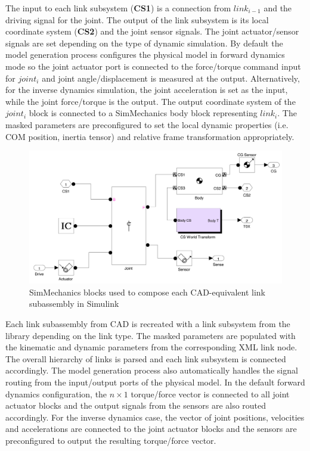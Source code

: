 The input to each link subsystem (\textbf{CS1}) is a connection from $link_{i-1}$ and the driving signal for the joint. The output of the link subsystem is its local coordinate system (\textbf{CS2}) and the joint sensor signals. The joint actuator/sensor signals are set depending on the type of dynamic simulation. By default the model generation process configures the physical model in forward dynamics mode so the joint actuator port is connected to the force/torque command input for $joint_{i}$ and joint angle/displacement is measured at the output. Alternatively, for the inverse dynamics simulation, the joint acceleration is set as the input, while the joint force/torque is the output. The output coordinate system of the $joint_{i}$ block is connected to a SimMechanics body block representing $link_{i}$. The masked parameters are preconfigured to set the local dynamic properties (i.e. COM position, inertia tensor) and relative frame transformation appropriately.

\begin{figure}[!h]
	\centering
    \includegraphics[scale=0.6]{fig/toolchain/undermask.pdf}
  	\caption{SimMechanics blocks used to compose each CAD-equivalent link subassembly in Simulink}
	\label{fig:undermask}
\end{figure}

Each link subassembly from CAD is recreated with a link subsystem from the library depending on the link type. The masked parameters are populated with the kinematic and dynamic parameters from the corresponding XML link node. The overall hierarchy of links is parsed and each link subsystem is connected accordingly. The model generation process also automatically handles the signal routing from the input/output ports of the physical model. In the default forward dynamics configuration, the $n \times 1$ torque/force vector is connected to all joint actuator blocks and the output signals from the sensors are also routed accordingly. For the inverse dynamics case, the vector of joint positions, velocities and accelerations are connected to the joint actuator blocks and the sensors are preconfigured to output the resulting torque/force vector.

